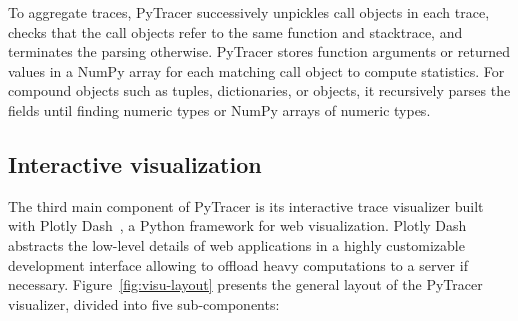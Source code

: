 \documentclass[10pt,journal,compsoc]{IEEEtran}
\newcommand{\pytracer}[0]{PyTracer\xspace}
\begin{document}
To aggregate traces, \pytracer successively unpickles call objects in each
trace, checks that the call objects refer to the same function and stacktrace,
and terminates the parsing otherwise. PyTracer stores function arguments or
returned values in a NumPy array for each matching call object to compute
statistics. For compound objects such as tuples, dictionaries, or objects, it
recursively parses the fields until finding numeric types or NumPy arrays of
numeric types.

\subsection{Interactive visualization}
The third main component of \pytracer is its interactive trace visualizer built
with Plotly Dash~\cite{plotly}, a Python framework for web visualization. Plotly
Dash abstracts the low-level details of web applications in a highly
customizable development interface allowing to offload heavy computations to a
server if necessary. Figure~\ref{fig:visu-layout} presents the general layout of
the \pytracer visualizer, divided into five sub-components:
\end{document}
